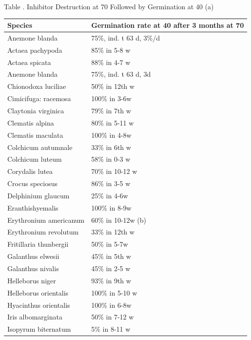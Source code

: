 \begin{table}[h]
\begin{center}
Table \thetable. Inhibitor Destruction at 70 Followed by Germination at 40 (a)
\end{center}

\par
\begin{tabular}{|l|l|}
\hline
Species             & Germination rate at 40 after 3 months at 70 \\
\hline
Anemone blanda      & 75\%, ind. t 63 d, 3\%/d \\
Actaea pachypoda      & 85\% in 5-8 w       \\
Actaea spicata      & 88\% in 4-7 w         \\
Anemone blanda      & 75\%, ind. t 63 d, 3d \\
Chionodoxa luciliae & 50\% in 12th w        \\
Cimicifuga: racemosa & 100\% in 3-6w        \\
Claytonia virginica &  79\% in 7th w        \\
Clematis alpina     & 80\% in 5-11 w        \\
Clematis maculata    & 100\% in 4-8w        \\
Colchicum autumnale  & 33\% in 6th w        \\
Colchicum luteum     & 58\% in 0-3 w        \\
Corydalis lutea     & 70\% in 10-12 w       \\
Crocus speciosus     & 86\% in 3-5 w        \\
Delphinium glaucum     & 25\% in 4-6w       \\
Eranthishyemalis       & 100\% in 8-9w      \\
Erythronium americanum & 60\% in 10-12w (b) \\
Erythronium revolutum  & 33\% in 12th w     \\
Fritillaria thunbergii & 50\% in 5-7w \\
Galanthus elwesii & 45\% in 5th w \\
Galanthus nivalis & 45\% in 2-5 w \\
Helleborus niger & 93\% in 9th w \\
Helleborus orientalis & 100\% in 5-10 w \\
Hyacinthus orientalis & 100\% in 6-8w \\
Iris albomarginata & 50\% in 7-12 w \\
Isopyrum biternatum & 5\% in 8-11 w \\

\end{tabular}
\end{table}
